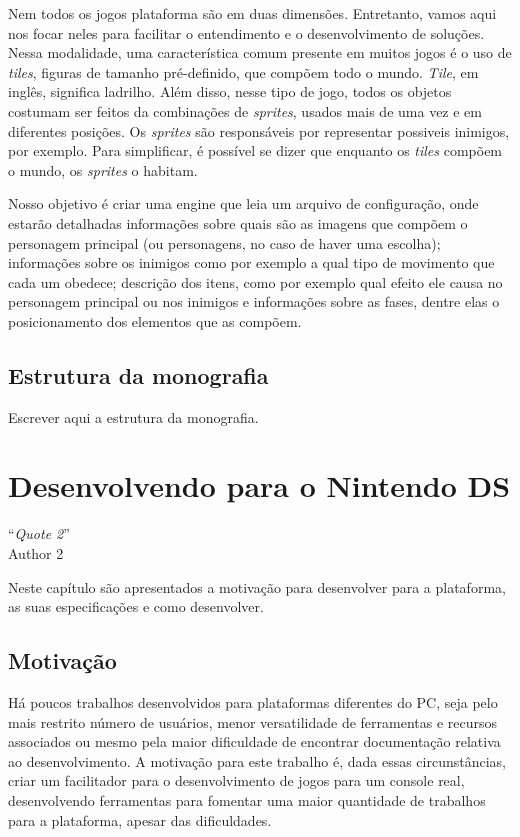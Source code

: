 \documentclass[brazil]{abnt}
\begin{document}
Nem todos os jogos plataforma são em duas dimensões. Entretanto, vamos aqui nos focar neles para facilitar o entendimento e o desenvolvimento de soluções. Nessa modalidade, uma característica comum presente em muitos jogos é o uso de \textit{tiles}, figuras de tamanho pré-definido, que compõem todo o mundo. \textit{Tile}, em inglês, significa ladrilho. Além disso, nesse tipo de jogo, todos os objetos costumam ser feitos da combinações de \textit{sprites}, usados mais de uma vez e em diferentes posições. Os \textit{sprites} são responsáveis por representar possiveis inimigos, por exemplo. Para simplificar, é possível se dizer que enquanto os \textit{tiles} compõem o mundo, os \textit{sprites} o habitam.

Nosso objetivo é criar uma engine que leia um arquivo de configuração, onde estarão detalhadas informações sobre quais são as imagens que compõem o personagem principal (ou personagens, no caso de haver uma escolha); informações sobre os inimigos como por exemplo a qual tipo de movimento que cada um obedece; descrição dos itens, como por exemplo qual efeito ele causa no personagem principal ou nos inimigos e informações sobre as fases, dentre elas o posicionamento dos elementos que as compõem.

\section{Estrutura da monografia}

Escrever aqui a estrutura da monografia.

\chapter{Desenvolvendo para o Nintendo DS\label{cap:hardds}}

\vfill{}
\begin{flushright}{}``\emph{Quote 2}''\\
{\small Author 2}\end{flushright}{\small \par}
\vfill{}

Neste capítulo são apresentados a motivação para desenvolver para a plataforma, as suas especificações e como desenvolver.
\newpage

\section{Motivação}

Há poucos trabalhos desenvolvidos para plataformas diferentes do PC, seja pelo mais restrito número de usuários, menor versatilidade de ferramentas e recursos associados ou mesmo pela maior dificuldade de encontrar documentação relativa ao desenvolvimento. A motivação para este trabalho é, dada essas circunstâncias, criar um facilitador para o desenvolvimento de jogos para um console real, desenvolvendo ferramentas para fomentar uma maior quantidade de trabalhos para a plataforma, apesar das dificuldades.
\end{document}
